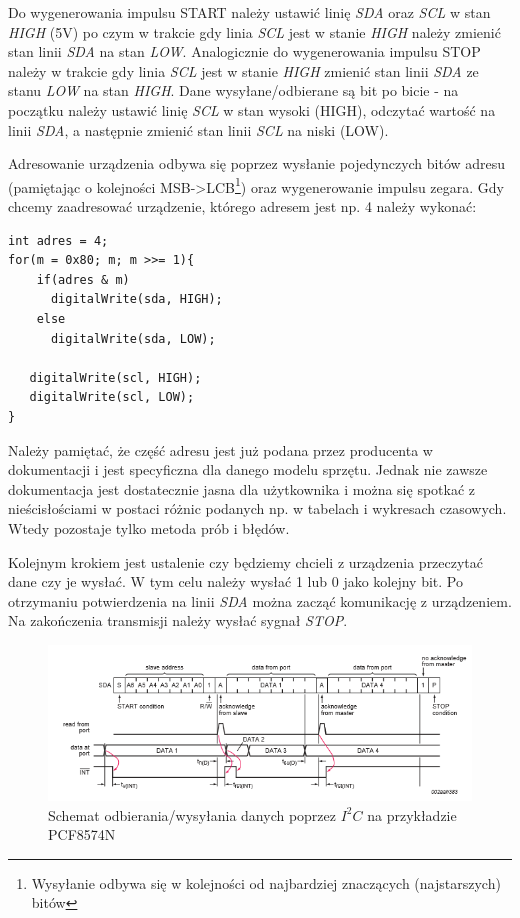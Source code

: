 \documentclass{xmgr}
\begin{document}
Do wygenerowania impulsu START należy ustawić linię \emph{SDA} oraz \emph{SCL} w stan \emph{HIGH} (5V) po czym w trakcie gdy linia \emph{SCL} jest w stanie \emph{HIGH} należy zmienić stan linii \emph{SDA} na stan \emph{LOW}. Analogicznie do wygenerowania impulsu STOP należy w trakcie gdy linia \emph{SCL} jest w stanie \emph{HIGH} zmienić stan linii \emph{SDA} ze stanu \emph{LOW} na stan \emph{HIGH}. Dane wysyłane/odbierane są bit po bicie - na początku należy ustawić linię \emph{SCL} w stan wysoki (HIGH), odczytać wartość na linii \emph{SDA}, a następnie zmienić stan linii \emph{SCL} na niski (LOW).

Adresowanie urządzenia odbywa się poprzez wysłanie pojedynczych bitów adresu (pamiętając o kolejności MSB->LCB\footnote{Wysyłanie odbywa się w kolejności od najbardziej znaczących (najstarszych) bitów}) oraz wygenerowanie impulsu zegara. Gdy chcemy zaadresować urządzenie, którego adresem jest np. 4 należy wykonać:
\begin{lstlisting}[label=bot-dirs-alg,caption=Własna wersja adresowania urządzenia $I^2C$ na przykładzie PCF8574N]
int adres = 4;
for(m = 0x80; m; m >>= 1){
    if(adres & m)         
      digitalWrite(sda, HIGH);
    else
      digitalWrite(sda, LOW);
        
   digitalWrite(scl, HIGH);
   digitalWrite(scl, LOW); 
}
\end{lstlisting}

Należy pamiętać, że część adresu jest już podana przez producenta w dokumentacji i jest specyficzna dla danego modelu sprzętu. Jednak nie zawsze dokumentacja jest dostatecznie jasna dla użytkownika i można się spotkać z nieścisłościami w postaci różnic podanych np. w tabelach i wykresach czasowych. Wtedy pozostaje tylko metoda prób i błędów.

Kolejnym krokiem jest ustalenie czy będziemy chcieli z urządzenia przeczytać dane czy je wysłać. W tym celu należy wysłać 1 lub 0  jako kolejny bit. Po otrzymaniu potwierdzenia na linii \emph{SDA} można zacząć komunikację z urządzeniem. Na zakończenia transmisji należy wysłać sygnał \emph{STOP}.

\begin{figure}[!h]
    \centering
    \includegraphics[height=0.25\textheight]{images/read_i2c.png}
    \caption{Schemat odbierania/wysyłania danych poprzez $I^2C$ na przykładzie PCF8574N\label{$I^2C$}}
\end{figure}
\end{document}
